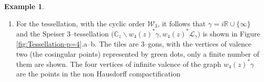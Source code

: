 \documentclass[final,3p,times]{elsarticle}
\newcommand{\CC}{\ensuremath{{\mathbb C}}}
\newcommand{\RR}{\ensuremath{{\mathbb R}}}
\newcommand{\R}{\ensuremath{{\mathcal R}}}
\theoremstyle{definition}
\newtheorem{example}{Example}[section]
\begin{document}
\begin{example}
\begin{enumerate}[label=\alph*),leftmargin=*]
\noindent
The decomposition of $\R_{w_4(z)}$ into the maximal domains of single--valuedness is
\begin{equation*}
\R_{w_4(z)} = \Bigg(
\mathfrak{L}_{6,1} \cup 
\mathfrak{L}_{5,1} \cup
\mathfrak{L}_{5,2} \cup
\mathfrak{L}_{5,3} \cup
\mathfrak{L}_{7,1} 
\ \cup
\bigcup_{\vartheta_1= 1}^\infty 
\mathfrak{L}_{1, \vartheta_1}
\cup
\bigcup_{\vartheta_2= 1}^\infty 
\mathfrak{L}_{2, \vartheta_2 }
\cup
\bigcup_{\vartheta_3= 1}^\infty 
\mathfrak{L}_{3, \vartheta_3 }
\cup
\bigcup_{\vartheta_4= 1}^\infty 
\mathfrak{L}_{4, \vartheta_4 }
\Bigg) \, \Big/ \sim \, .
\end{equation*}


On the other hand, considering the cyclic order 

\centerline{$\mathcal{W}_3 = [ {\tt a}_2, {\tt a}_1, {\tt a}_3 ] =
[-\frac{3 i}{\sqrt{\pi }},0,\frac{3 i}{\sqrt{\pi }} ]$,}

\noindent  
the decomposition of $\R_{w(z)}$ into ${\tt p}=4$ maximal logarithmic towers 
and the unique soul is
\begin{multline*}
\R_{w_4(z)} = \Big[
\underbrace{
\mathfrak{H}^-\backslash ( \overline{{\tt a}_1 {\tt a}_3} \cup  \overline{{\tt a}_2 {\tt a}_1}
\cup  \overline{{\tt a}_3 {\tt a}_2} ) 
\cup
\bigcup_{\vartheta=1}^4 \big( 
\mathfrak{H}^+\backslash \overline{{\tt a}_3 {\tt a}_2} 
\cup
\mathfrak{H}^-\backslash \overline{{\tt a}_3 {\tt a}_2} 
\big)_\vartheta
\cup 
\mathfrak{H}^+\backslash ( \overline{{\tt a}_1 {\tt a}_3} \cup  \overline{{\tt a}_2 {\tt a}_1}
\cup  \overline{{\tt a}_3 {\tt a}_2} )
}_{\text{soul}}
\\ 
\cup
\underbrace{ \mathcal{T}^\circ_- ({\tt a}_1, {\tt a}_3) }_{\text{logarithmic tower}}
\cup
\underbrace{ \mathcal{T}^\circ_- ({\tt a}_2, {\tt a}_1) }_{\text{logarithmic tower}}
\cup
\underbrace{ \mathcal{T}^\times_+ ({\tt a}_2, {\tt a}_1) }_{\text{logarithmic tower}} 
\cup
\underbrace{ \mathcal{T}^\times_+ ({\tt a}_1, {\tt a}_3) }_{\text{logarithmic tower}}
\Big] \, \Big/ \sim.
\end{multline*}

\item
For the tessellation, with the cyclic order $\mathcal{W}_3$, it follows that
$\gamma=i\RR\cup\{\infty\}$ and the Speiser $3$--tessellation 
$\big(\CC_z \backslash w_4(z)^*\gamma, w_4(z)^*\mathcal{L}_\gamma \big)$ is
shown in Figure \ref{fig:Tessellation-p=4}.a--b.
The tiles are $3$--gons, with the vertices of valence two (the cosingular points) 
represented by green dots, only a finite number of them are shown. 
The four vertices of infinite valence of 
the graph $w_4(z)^*\gamma$
are the points in the non Hausdorff compactification 


\end{enumerate}
\end{example}
\end{document}

